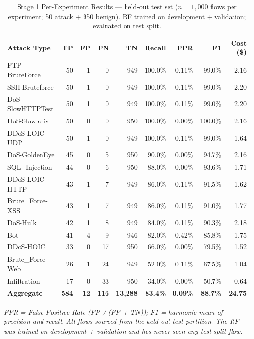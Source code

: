 \documentclass[../main.tex]{subfiles}
\begin{document}
\begin{table}[H]
\centering
\caption{Stage 1 Per-Experiment Results --- held-out test set ($n = 1{,}000$ flows per experiment; 50 attack + 950 benign). RF trained on development + validation; evaluated on test split.}
\label{tab:stage1-results}
\scriptsize
\begin{tabularx}{\textwidth}{@{}l r r r r r r r r@{}}
\toprule
Attack Type & TP & FP & FN & TN & Recall & FPR & F1 & Cost (\$) \\
\midrule
FTP-BruteForce & 50 & 1 & 0 & 949 & 100.0\% & 0.11\% & 99.0\% & 2.16 \\
SSH-Bruteforce & 50 & 1 & 0 & 949 & 100.0\% & 0.11\% & 99.0\% & 2.20 \\
DoS-SlowHTTPTest & 50 & 1 & 0 & 949 & 100.0\% & 0.11\% & 99.0\% & 2.20 \\
DoS-Slowloris & 50 & 0 & 0 & 950 & 100.0\% & 0.00\% & 100.0\% & 2.16 \\
DDoS-LOIC-UDP & 50 & 1 & 0 & 949 & 100.0\% & 0.11\% & 99.0\% & 1.64 \\
DoS-GoldenEye & 45 & 0 & 5 & 950 & 90.0\% & 0.00\% & 94.7\% & 2.16 \\
SQL\_Injection & 44 & 0 & 6 & 950 & 88.0\% & 0.00\% & 93.6\% & 1.71 \\
DDoS-LOIC-HTTP & 43 & 1 & 7 & 949 & 86.0\% & 0.11\% & 91.5\% & 1.62 \\
Brute\_Force-XSS & 43 & 1 & 7 & 949 & 86.0\% & 0.11\% & 91.0\% & 1.77 \\
DoS-Hulk & 42 & 1 & 8 & 949 & 84.0\% & 0.11\% & 90.3\% & 2.18 \\
Bot & 41 & 4 & 9 & 946 & 82.0\% & 0.42\% & 85.8\% & 1.75 \\
DDoS-HOIC & 33 & 0 & 17 & 950 & 66.0\% & 0.00\% & 79.5\% & 1.52 \\
Brute\_Force-Web & 26 & 1 & 24 & 949 & 52.0\% & 0.11\% & 67.5\% & 1.04 \\
Infiltration & 17 & 0 & 33 & 950 & 34.0\% & 0.00\% & 50.7\% & 0.64 \\
\midrule
\textbf{Aggregate} & \textbf{584} & \textbf{12} & \textbf{116} & \textbf{13,288} & \textbf{83.4\%} & \textbf{0.09\%} & \textbf{88.7\%} & \textbf{24.75} \\
\bottomrule
\end{tabularx}

\vspace{0.5em}
\noindent\textit{FPR = False Positive Rate (FP / (FP + TN)); F1 = harmonic mean of precision and recall. All flows sourced from the held-out test partition. The RF was trained on development + validation and has never seen any test-split flow.}
\end{table}
\end{document}

